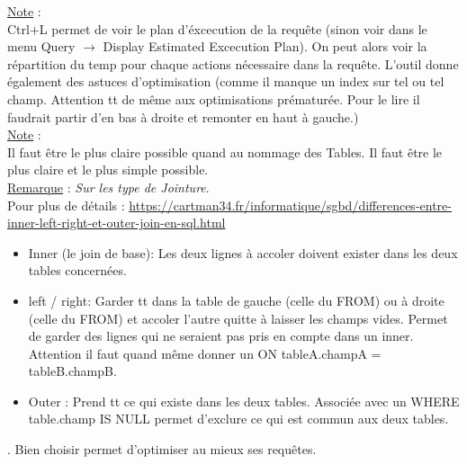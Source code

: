 \documentclass[a4paper,12pt,twoside]{article}
\newcommand{\rem}[2]{\noindent\underline{Remarque} : \textit{#1}.\\ \indent #2}
\newcommand{\note}[1]{\noindent\underline{Note} : \\ \indent #1}
\begin{document}
\note{Ctrl$+$L permet de voir le plan d'éxcecution de la requête (sinon voir dans le menu Query $\to$ Display Estimated Excecution Plan). On peut alors voir la répartition du temp pour chaque actions nécessaire dans la requête. L'outil donne également des astuces d'optimisation (comme il manque un index sur tel ou tel champ. Attention tt de même aux optimisations prématurée. Pour le lire il faudrait partir d'en bas à droite et remonter en haut à gauche.)}\\

\note{Il faut être le plus claire possible quand au nommage des Tables. Il faut être le plus claire et le plus simple possible.}\\

\rem{Sur les type de Jointure}{Pour plus de détails : \url{https://cartman34.fr/informatique/sgbd/differences-entre-inner-left-right-et-outer-join-en-sql.html}
\begin{itemize}
\item Inner (le join de base): Les deux lignes à accoler doivent exister dans les deux tables concernées.
\item left / right: Garder tt dans la table de gauche (celle du FROM) ou à droite (celle du FROM) et accoler l'autre quitte à laisser les champs vides. Permet de garder des lignes qui ne seraient pas pris en compte dans un inner. Attention il faut quand même donner un ON tableA.champA = tableB.champB.
\item Outer : Prend tt ce qui existe dans les deux tables. Associée avec un WHERE table.champ IS NULL permet d'exclure ce qui est commun aux deux tables.  
\end{itemize}. Bien choisir permet d'optimiser au mieux ses requêtes. \\}



\newpage
\printglossary[type=\acronymtype]%
\glsaddallunused %
\printglossary[type = main,nonumberlist]%
\end{document}
